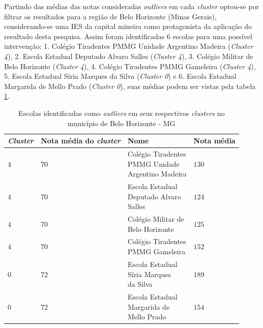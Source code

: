 \documentclass[12pt]{article}
\begin{document}
Partindo das médias das notas consideradas \textit{outliers} em cada \textit{cluster} optou-se por filtrar os resultados para a região de Belo Horizonte (Minas Gerais), considerando-se uma IES da capital mineira como protagonista da aplicação do resultado desta pesquisa. Assim foram identificadas $6$ escolas para uma possível intervenção: 1. Colégio Tiradentes PMMG Unidade Argentino Madeira (\textit{Cluster 4}), 2. Escola Estadual Deputado Alvaro Salles (\textit{Cluster 4}), 3. Colégio Militar de Belo Horizonte (\textit{Cluster 4}), 4. Colégio Tiradentes PMMG Gameleira (\textit{Cluster 4}), 5. Escola Estadual Síria Marques da Silva (\textit{Cluster 0}) e 6. Escola Estadual Margarida de Mello Prado (\textit{Cluster 0}), suas médias podem ser vistas pela tabela \ref{tab:res_outliers}.

\begin{table}[htbp]
\centering
\renewcommand{\arraystretch}{2}
\setlength{\tabcolsep}{6pt}
\begin{tabular}{|>{\centering\arraybackslash}m{1.5cm}|>{\centering\arraybackslash}m{2.2cm}|>{\centering\arraybackslash}m{5cm}|>{\centering\arraybackslash}m{2cm}|}
\hline
\textit{Cluster} & Nota média do \textit{cluster} & Nome & Nota média \\
\hline
$4$ & $70$ & \makecell[c]{Colégio Tiradentes\\PMMG Unidade\\Argentino Madeira} & $130$ \\
\hline
$4$ & $70$ & \makecell[c]{Escola Estadual\\Deputado Alvaro\\Salles} & $124$ \\
\hline
$4$ & $70$ & \makecell[c]{Colégio Militar de\\Belo Horizonte} & $125$ \\
\hline
$4$ & $70$ & \makecell[c]{Colégio Tiradentes\\PMMG Gameleira} & $152$ \\
\hline
$0$ & $72$ & \makecell[c]{Escola Estadual\\Síria Marques\\da Silva} & $189$ \\
\hline
$0$ & $72$ & \makecell[c]{Escola Estadual\\Margarida de\\Mello Prado} & $154$ \\
\hline
\end{tabular}
\caption{Escolas identificadas como \textit{outliers} em seus respectivos \textit{clusters} no município de Belo Horizonte - MG}
\label{tab:res_outliers}
\end{table}
\end{document}
